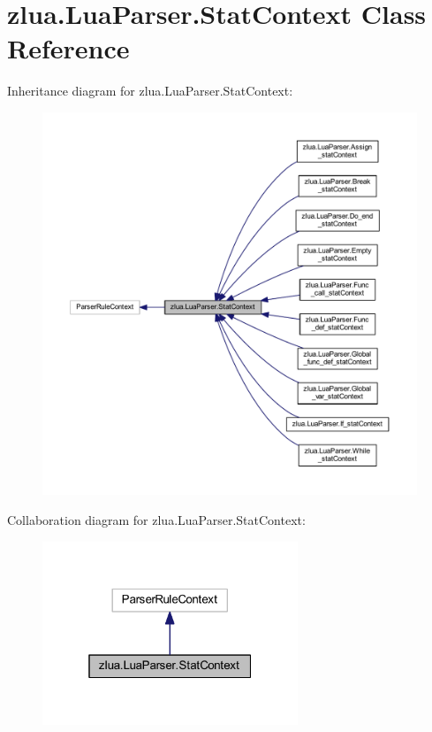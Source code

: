 \hypertarget{classzlua_1_1_lua_parser_1_1_stat_context}{}\section{zlua.\+Lua\+Parser.\+Stat\+Context Class Reference}
\label{classzlua_1_1_lua_parser_1_1_stat_context}


Inheritance diagram for zlua.\+Lua\+Parser.\+Stat\+Context\+:
\nopagebreak
\begin{figure}[H]
\begin{center}
\leavevmode
\includegraphics[width=350pt]{classzlua_1_1_lua_parser_1_1_stat_context__inherit__graph}
\end{center}
\end{figure}


Collaboration diagram for zlua.\+Lua\+Parser.\+Stat\+Context\+:
\nopagebreak
\begin{figure}[H]
\begin{center}
\leavevmode
\includegraphics[width=217pt]{classzlua_1_1_lua_parser_1_1_stat_context__coll__graph}
\end{center}
\end{figure}
